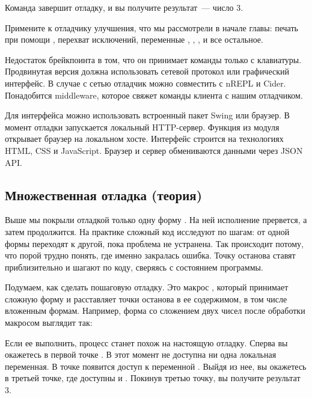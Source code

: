 Команда  завершит отладку, и вы получите результат~--- число 3.

Примените к отладчику улучшения, что мы рассмотрели в начале главы: печать при помощи , перехват исключений, переменные , , ,  и все остальное.

Недостаток брейкпоинта в том, что он принимает команды только с клавиатуры. Продвинутая версия должна использовать сетевой протокол или графический интерфейс. В случае с сетью отладчик можно совместить с nREPL и Cider. Понадобится middleware, которое свяжет команды клиента с нашим отладчиком.

Для интерфейса можно использовать встроенный пакет Swing или браузер. В момент отладки запускается локальный HTTP-сервер. Функция  из модуля  открывает браузер на локальном хосте. Интерфейс строится на технологиях HTML, CSS и JavaScript. Браузер и сервер обмениваются данными через JSON API.

\subsection{Множественная отладка (теория)}

Выше мы покрыли отладкой только одну форму . На ней исполнение прервется, а затем продолжится. На практике сложный код исследуют по шагам: от одной формы переходят к другой, пока проблема не устранена. Так происходит потому, что порой трудно понять, где именно закралась ошибка. Точку останова ставят приблизительно и шагают по коду, сверяясь с состоянием программы.

Подумаем, как сделать пошаговую отладку. Это макрос , который принимает сложную форму и расставляет точки останова в ее содержимом, в том числе вложенным формам. Например, форма  со сложением двух чисел после обработки макросом выглядит так:

\begin{english}
\end{english}

Если ее выполнить, процесс станет похож на настоящую отладку. Сперва вы окажетесь в первой точке . В этот момент не доступна ни одна локальная переменная. В точке  появится доступ к переменной . Выйдя из нее, вы окажетесь в третьей точке, где доступны  и . Покинув третью точку, вы получите результат 3.

